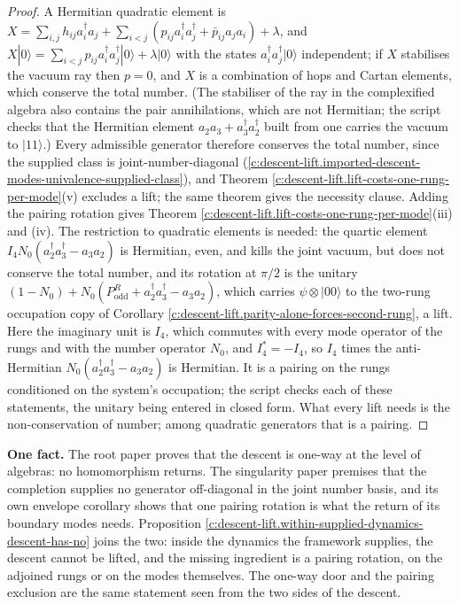 \documentclass[11pt]{article}
\theoremstyle{definition}
\theoremstyle{plain}
\providecommand{\ket}{}\renewcommand{\ket}[1]{|#1\rangle}
\begin{document}
\begin{proof}
A Hermitian quadratic element is $X = \sum_{i,j} h_{ij}a^{\dagger}_{i}a_{j} + \sum_{i<j} (p_{ij}a^{\dagger}_{i}a^{\dagger}_{j} + \bar{p}_{ij}a_{j}a_{i}) + \lambda$, and $X\ket{0} = \sum_{i<j} p_{ij}a^{\dagger}_{i}a^{\dagger}_{j}\ket{0} + \lambda\ket{0}$ with the states $a^{\dagger}_{i}a^{\dagger}_{j}\ket{0}$ independent; if $X$ stabilises the vacuum ray then $p = 0$, and $X$ is a combination of hops and Cartan elements, which conserve the total number. (The stabiliser of the ray in the complexified algebra also contains the pair annihilations, which are not Hermitian; the script checks that the Hermitian element $a_{2}a_{3} + a^{\dagger}_{3}a^{\dagger}_{2}$ built from one carries the vacuum to $\ket{11}$.) Every admissible generator therefore conserves the total number, since the supplied class is joint-number-diagonal (\ref{c:descent-lift.imported-descent-modes-univalence-supplied-class}), and Theorem \ref{c:descent-lift.lift-costs-one-rung-per-mode}(v) excludes a lift; the same theorem gives the necessity clause. Adding the pairing rotation gives Theorem \ref{c:descent-lift.lift-costs-one-rung-per-mode}(iii) and (iv). The restriction to quadratic elements is needed: the quartic element $I_{4}N_{0}(a^{\dagger}_{2}a^{\dagger}_{3} - a_{3}a_{2})$ is Hermitian, even, and kills the joint vacuum, but does not conserve the total number, and its rotation at $\pi/2$ is the unitary $(1 - N_{0}) + N_{0}(P^{R}_{\mathrm{odd}} + a^{\dagger}_{2}a^{\dagger}_{3} - a_{3}a_{2})$, which carries $\psi \otimes \ket{00}$ to the two-rung occupation copy of Corollary \ref{c:descent-lift.parity-alone-forces-second-rung}, a lift. Here the imaginary unit is $I_{4}$, which commutes with every mode operator of the rungs and with the number operator $N_{0}$, and $I_{4}^{*} = -I_{4}$, so $I_{4}$ times the anti-Hermitian $N_{0}(a^{\dagger}_{2}a^{\dagger}_{3} - a_{3}a_{2})$ is Hermitian. It is a pairing on the rungs conditioned on the system's occupation; the script checks each of these statements, the unitary being entered in closed form. What every lift needs is the non-conservation of number; among quadratic generators that is a pairing.

\end{proof}

\label{c:note.descent-lift.setting-what-does-two-papers-what}
\textbf{One fact.} The root paper proves that the descent is one-way at the level of algebras: no homomorphism returns. The singularity paper premises that the completion supplies no generator off-diagonal in the joint number basis, and its own envelope corollary shows that one pairing rotation is what the return of its boundary modes needs. Proposition \ref{c:descent-lift.within-supplied-dynamics-descent-has-no} joins the two: inside the dynamics the framework supplies, the descent cannot be lifted, and the missing ingredient is a pairing rotation, on the adjoined rungs or on the modes themselves. The one-way door and the pairing exclusion are the same statement seen from the two sides of the descent.
\end{document}
